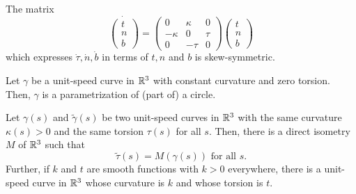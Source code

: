 \begin{note}
  The matrix
  \[
    \dot{
      \begin{pmatrix}
        t\\
        n\\
        b
      \end{pmatrix}
    }
    =
    \begin{pmatrix}
      0 & \kappa & 0 \\
      -\kappa & 0 & \tau \\
      0 & -\tau & 0
    \end{pmatrix}
    \begin{pmatrix}
      t\\
      n\\
      b
    \end{pmatrix}
  \]
  which expresses $\dot{\tau}, \dot{n}, \dot{b}$ in terms of $t, n$ and $b$ is skew-symmetric.
\end{note}

\begin{proposition}
  Let $\gamma$ be a unit-speed curve in $\mathbb{R}^3$ with constant curvature and zero torsion.
  Then, $\gamma$ is a parametrization of (part of) a circle.
\end{proposition}

\begin{theorem}
  Let $\gamma(s)$ and $\tilde \gamma(s)$ be two unit-speed curves in $\mathbb{R}^3$ with the same curvature
  $\kappa(s) > 0$ and the same torsion $\tau(s)$ for all $s$.
  Then, there is a direct isometry $M$ of $\mathbb{R}^3$ such that
  \[
    \tilde \tau(s) = M(\gamma(s)) \text{ for all } s.
  \]
  Further, if $k$ and $t$ are smooth functions with $k > 0$ everywhere,
  there is a unit-speed curve in $\mathbb{R}^3$ whose curvature is $k$ and whose torsion is $t$.
\end{theorem}